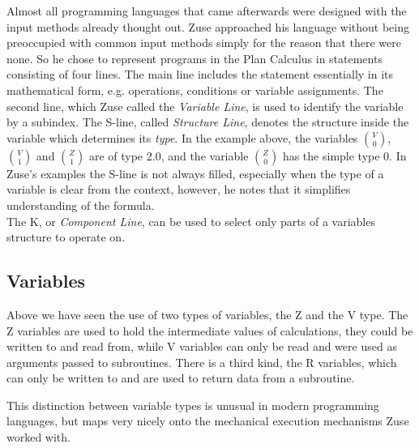 \documentclass{llncs}
\begin{document}
   Almost all programming languages that came afterwards were designed with the input
   methods already thought out. Zuse approached his language without being preoccupied 
   with common input methods simply for the reason that there were none. So he chose 
   to represent programs in the Plan Calculus in statements consisting of four lines. 
   The main line includes the statement essentially in its mathematical form, 
   e.g. operations, conditions or variable assignments.
   The second line, which Zuse called the \emph{Variable Line}, is used to identify 
   the variable by a subindex. The S-line, called \emph{Structure Line}, denotes the 
   structure inside the variable which determines its \emph{type}. In the example above, the variables 
   $\binom{V}{0}$, $\binom{V}{1}$ and $\binom{Z}{1}$ are of type 2.0, and the variable $\binom{Z}{0}$
   has the simple type 0. In Zuse's examples the S-line is not always filled, especially when the 
   type of a variable is clear from the context, however, he notes that it simplifies understanding 
   of the formula\cite{bauer1972plankalkuel}.\\
   The K, or \emph{Component Line}, can be used to select only parts of a variables structure to operate 
   on.
 \subsection{Variables}
   Above we have seen the use of two types of variables, the Z and the V type. The Z variables are 
   used to hold the intermediate values of calculations, they could be written to and read from, while 
   V variables can only be read and were used as arguments passed to subroutines. There is a third kind, 
   the R variables, which can only be written to and are used to return data from a subroutine.

   This distinction between variable types is unusual in modern programming languages, but maps 
   very nicely onto the mechanical execution mechanisms Zuse worked with.
\end{document}
